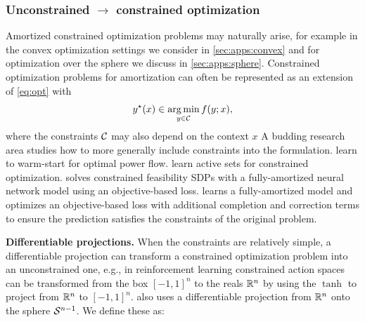 \documentclass[twoside,11pt]{article}
\newcommand{\eg}{e.g.\xspace}
\begin{document}
\subsubsection{Unconstrained $\rightarrow$ constrained optimization}
\label{sec:constraints}
Amortized constrained optimization problems may naturally arise, for example
in the convex optimization settings we consider in \cref{sec:apps:convex}
and for optimization over the sphere we discuss in \cref{sec:apps:sphere}.
Constrained optimization problems for amortization can often be represented as
an extension of \cref{eq:opt} with
\begin{equation}
  y^\star(x) \in \operatorname*{arg\,min}_{y\in{\mathcal{C}}} f(y; x),
  \label{eq:opt-constrained}
\end{equation}
where the constraints ${\mathcal{C}}$ may also depend on the context $x$
A budding research area studies how to more generally include
constraints into the formulation.
\citet{baker2019learning,dong2020smart,zamzam2020learning,pan2020deepopf}
learn to warm-start for optimal power flow.
\citet{misra2021learning} learn active sets for constrained optimization.
\citet{krivachy2020fast} solves constrained feasibility SDPs
with a fully-amortized neural network model using an
objective-based loss.
\citet{donti2021dc3} learns a fully-amortized model and optimizes an
objective-based loss with additional completion and correction terms
to ensure the prediction satisfies the constraints of the original problem.

\textbf{Differentiable projections.}
When the constraints are relatively simple, a differentiable projection
can transform a constrained optimization problem into an unconstrained one,
\eg, in reinforcement learning constrained action spaces can be transformed
from the box $[-1,1]^n$ to the reals $\mathbb{R}^n$ by using
the $\tanh$ to project from $\mathbb{R}^n$ to $[-1,1]^n$.
 also uses a differentiable projection from $\mathbb{R}^n$
onto the sphere ${\mathcal{S}}^{n-1}$.
We define these as: \\
\end{document}
